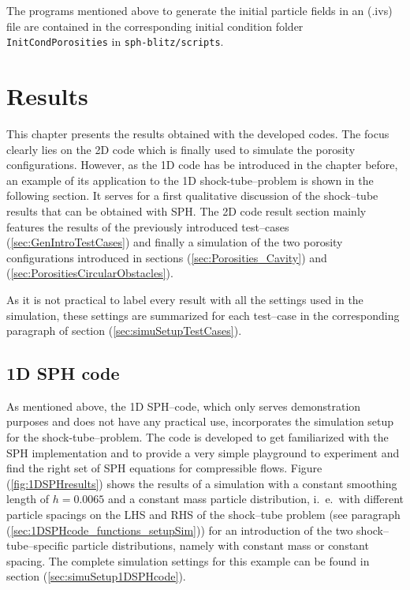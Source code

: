 \documentclass[11pt,a4paper,twoside]{report}
\begin{document}
The programs mentioned above to generate the initial particle fields in an (.ivs) file are contained in the corresponding initial condition folder {\tt InitCondPorosities} in {\tt sph-blitz/scripts}.



\chapter{Results}
\label{sec:Results}
This chapter presents the results obtained with the developed codes. The focus clearly lies on the 2D code which is finally used to simulate the porosity configurations. However, as the 1D code has be introduced in the chapter before, an example of its application to the 1D shock-tube--problem is shown in the following section. It serves for a first qualitative discussion of the shock--tube results that can be obtained with SPH.
The 2D code result section mainly features the results of the previously introduced test--cases (\ref{sec:GenIntroTestCases}) and finally a simulation of the two porosity configurations introduced in sections (\ref{sec:Porosities_Cavity}) and (\ref{sec:PorositiesCircularObstacles}).

As it is not practical to label every result with all the settings used in the simulation, these settings are summarized for each test--case in the corresponding paragraph of section (\ref{sec:simuSetupTestCases}).

\section{1D SPH code}
\label{sec:1DSPHcodeResults}
As mentioned above, the 1D SPH--code, which only serves demonstration purposes and does not have any practical use, incorporates the simulation setup for the shock-tube--problem. The code is developed to get familiarized with the SPH implementation and to provide a very simple playground to experiment and find the right set of SPH equations for compressible flows. Figure (\ref{fig:1DSPHresults}) shows the results of a simulation with a constant smoothing length of $h=0.0065$ and a constant mass particle distribution, i.\ e.\ with different particle spacings on the LHS and RHS of the shock--tube problem (see paragraph (\ref{sec:1DSPHcode_functions_setupSim})) for an introduction of the two shock--tube--specific particle distributions, namely with constant mass or constant spacing. The complete simulation settings for this example can be found in section (\ref{sec:simuSetup1DSPHcode}). 
\end{document}
